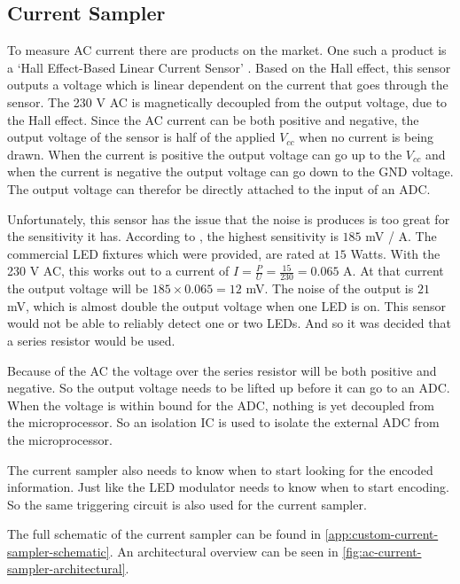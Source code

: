 \subsection{Current Sampler}

To measure AC current there are products on the market.
One such a product is a `Hall Effect-Based Linear Current Sensor' \cite{hall-ac-current-sensor-datasheet}.
Based on the Hall effect, this sensor outputs a voltage which is linear dependent on the current that goes through the sensor.
The 230 V AC is magnetically decoupled from the output voltage, due to the Hall effect.
Since the AC current can be both positive and negative, the output voltage of the sensor is half of the applied $V_{cc}$ when no current is being drawn.
When the current is positive the output voltage can go up to the $V_{cc}$ and when the current is negative the output voltage can go down to the GND voltage. 
The output voltage can therefor be directly attached to the input of an ADC.


Unfortunately, this sensor has the issue that the noise is produces is too great for the sensitivity it has.
According to \cite{hall-ac-current-sensor-datasheet}, the highest sensitivity is $185$ mV / A.
The commercial LED fixtures which were provided, are rated at $15$ Watts.
With the 230 V AC, this works out to a current of $I = \frac{P}{U} = \frac{15}{230} = 0.065$ A.
At that current the output voltage will be $185 \times 0.065 = 12$ mV.
The noise of the output is $21$ mV, which is almost double the output voltage when one LED is on.
This sensor would not be able to reliably detect one or two LEDs.
And so it was decided that a series resistor would be used.

Because of the AC the voltage over the series resistor will be both positive and negative.
So the output voltage needs to be lifted up before it can go to an ADC.
When the voltage is within bound for the ADC, nothing is yet decoupled from the microprocessor.
So an isolation IC is used to isolate the external ADC from the microprocessor.

The current sampler also needs to know when to start looking for the encoded information.
Just like the LED modulator needs to know when to start encoding.
So the same triggering circuit is also used for the current sampler.

The full schematic of the current sampler can be found in \autoref{app:custom-current-sampler-schematic}.
An architectural overview can be seen in \autoref{fig:ac-current-sampler-architectural}.


